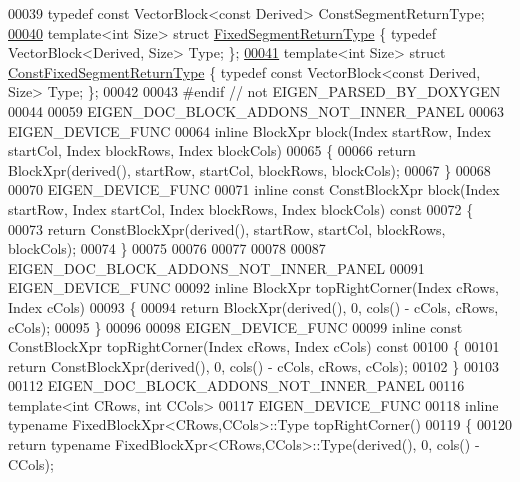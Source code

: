 \begin{DoxyCode}
00039 \textcolor{keyword}{typedef} \textcolor{keyword}{const} VectorBlock<const Derived> ConstSegmentReturnType;
\hyperlink{struct_fixed_segment_return_type}{00040} \textcolor{keyword}{template}<\textcolor{keywordtype}{int} Size> \textcolor{keyword}{struct }\hyperlink{struct_fixed_segment_return_type}{FixedSegmentReturnType} \{ \textcolor{keyword}{typedef} VectorBlock<Derived, Size>
       Type; \};
\hyperlink{struct_const_fixed_segment_return_type}{00041} \textcolor{keyword}{template}<\textcolor{keywordtype}{int} Size> \textcolor{keyword}{struct }\hyperlink{struct_const_fixed_segment_return_type}{ConstFixedSegmentReturnType} \{ \textcolor{keyword}{typedef} \textcolor{keyword}{const} 
      VectorBlock<const Derived, Size> Type; \};
00042 
00043 \textcolor{preprocessor}{#endif // not EIGEN\_PARSED\_BY\_DOXYGEN}
00044 
00059 EIGEN\_DOC\_BLOCK\_ADDONS\_NOT\_INNER\_PANEL
00063 EIGEN\_DEVICE\_FUNC
00064 \textcolor{keyword}{inline} BlockXpr block(Index startRow, Index startCol, Index blockRows, Index blockCols)
00065 \{
00066   \textcolor{keywordflow}{return} BlockXpr(derived(), startRow, startCol, blockRows, blockCols);
00067 \}
00068 
00070 EIGEN\_DEVICE\_FUNC
00071 \textcolor{keyword}{inline} \textcolor{keyword}{const} ConstBlockXpr block(Index startRow, Index startCol, Index blockRows, Index blockCols)\textcolor{keyword}{ const}
00072 \textcolor{keyword}{}\{
00073   \textcolor{keywordflow}{return} ConstBlockXpr(derived(), startRow, startCol, blockRows, blockCols);
00074 \}
00075 
00076 
00077 
00078 
00087 EIGEN\_DOC\_BLOCK\_ADDONS\_NOT\_INNER\_PANEL
00091 EIGEN\_DEVICE\_FUNC
00092 \textcolor{keyword}{inline} BlockXpr topRightCorner(Index cRows, Index cCols)
00093 \{
00094   \textcolor{keywordflow}{return} BlockXpr(derived(), 0, cols() - cCols, cRows, cCols);
00095 \}
00096 
00098 EIGEN\_DEVICE\_FUNC
00099 \textcolor{keyword}{inline} \textcolor{keyword}{const} ConstBlockXpr topRightCorner(Index cRows, Index cCols)\textcolor{keyword}{ const}
00100 \textcolor{keyword}{}\{
00101   \textcolor{keywordflow}{return} ConstBlockXpr(derived(), 0, cols() - cCols, cRows, cCols);
00102 \}
00103 
00112 EIGEN\_DOC\_BLOCK\_ADDONS\_NOT\_INNER\_PANEL
00116 \textcolor{keyword}{template}<\textcolor{keywordtype}{int} CRows, \textcolor{keywordtype}{int} CCols>
00117 EIGEN\_DEVICE\_FUNC
00118 \textcolor{keyword}{inline} \textcolor{keyword}{typename} FixedBlockXpr<CRows,CCols>::Type topRightCorner()
00119 \{
00120   \textcolor{keywordflow}{return} \textcolor{keyword}{typename} FixedBlockXpr<CRows,CCols>::Type(derived(), 0, cols() - CCols);

\end{DoxyCode}
